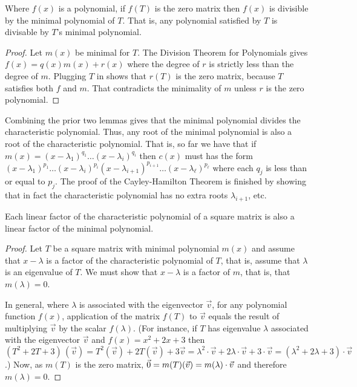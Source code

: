\begin{lemma}
Where \( f(x) \) is a polynomial, if \( f(T) \) is the zero matrix 
then \( f(x) \) is divisible by the minimal polynomial of \( T \).
That is, any polynomial satisfied by \( T \) is divisable by
\( T \)'s minimal polynomial.
\end{lemma}

\begin{proof}
Let \( m(x) \) be minimal for \( T \).
The Division Theorem for Polynomials gives
\( f(x)=q(x)m(x)+r(x) \)
where the degree of \( r \) is strictly less than the degree of \( m \).
Plugging \( T \) in shows that \( r(T) \) is the zero matrix,
because $T$ satisfies both $f$ and $m$.
That contradicts the minimality of \( m \) unless \( r \)
is the zero polynomial.
\end{proof}

Combining the prior two lemmas gives that the minimal polynomial 
divides the characteristic polynomial. 
Thus,
any root of the minimal polynomial is also a root of the characteristic
polynomial. 
That is, so far we have that if 
\( m(x)=(x-\lambda_1)^{q_1}\dots(x-\lambda_i)^{q_i} \) then
\( c(x) \) must has the form
\( (x-\lambda_1)^{p_1}\dots(x-\lambda_i)^{p_i}
     (x-\lambda_{i+1})^{p_{i+1}}\dots(x-\lambda_\ell)^{p_\ell} \) where
each \( q_j \) is less than or equal to \( p_j \).
The proof of the Cayley-Hamilton Theorem is finished by showing that 
in fact the characteristic polynomial has no extra roots
$\lambda_{i+1}$, etc.

\begin{lemma}
Each linear factor of the characteristic polynomial of a square matrix
is also a linear factor of the minimal polynomial.
\end{lemma}

\begin{proof}
Let \( T \) be a square matrix with minimal polynomial \( m(x) \) and 
assume that \( x-\lambda \) is a factor of the characteristic polynomial of 
\( T \), that is, assume that \( \lambda \) is an eigenvalue of \( T \).
We must show that $x-\lambda$ is a factor of $m$, that is, that 
$m(\lambda)=0$.

In general,
where \( \lambda \) is associated with the eigenvector \( \vec{v} \),
for any polynomial function \( f(x) \), application of the matrix \( f(T) \)
to \( \vec{v} \) equals the result of multiplying \( \vec{v} \) by the scalar
\( f(\lambda) \).
(For instance, if $T$ has eigenvalue $\lambda$ associated with the 
eigenvector $\vec{v}$ and $f(x)=x^2+2x+3$ then
\( (T^2+2T+3)\,(\vec{v})=T^2(\vec{v})+2T(\vec{v})+3\vec{v}=
  \lambda^2\cdot\vec{v}+2\lambda\cdot\vec{v}+3\cdot\vec{v}=
  (\lambda^2+2\lambda+3)\cdot\vec{v} \).)
Now, as \( m(T) \) is the zero matrix,
\( \vec{0}=m(T)(\vec{v})=m(\lambda)\cdot\vec{v} \) and
therefore \( m(\lambda)=0 \).
\end{proof}

